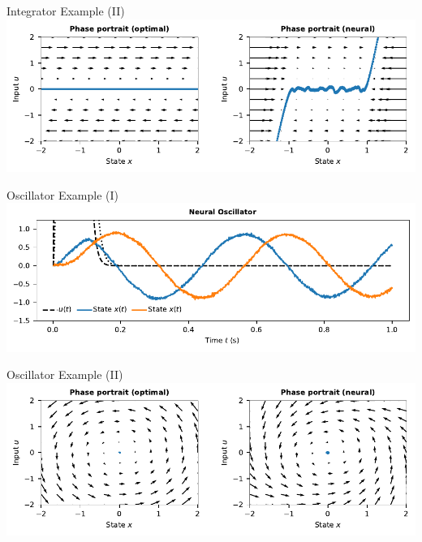 \documentclass[handout,aspectratio=169]{beamer}
\begin{document}
	\begin{frame}{Integrator Example (II)}
		\centering
		\includegraphics[width=\textwidth]{media/example_integrator_phases.pdf}
	\end{frame}

	\begin{frame}{Oscillator Example (I)}
		\centering
		\includegraphics[width=\textwidth]{media/example_oscillator.pdf}
	\end{frame}

	\begin{frame}{Oscillator Example (II)}
		\centering
		\includegraphics[width=\textwidth]{media/example_oscillator_phases.pdf}
	\end{frame}
\end{document}
